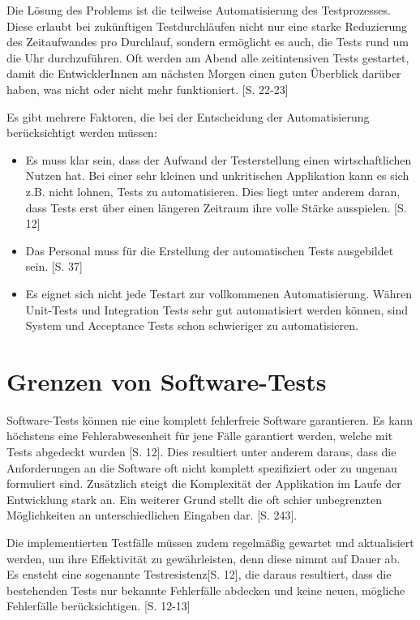 \documentclass[a4paper,bibtotoc,oneside]{scrbook}
\begin{document}
Die Lösung des Problems ist die teilweise Automatisierung des Testprozesses. Diese erlaubt bei zukünftigen Testdurchläufen nicht nur eine starke Reduzierung des Zeitaufwandes pro Durchlauf, sondern ermöglicht es auch, die Tests rund um die Uhr durchzuführen. Oft werden am Abend alle zeitintensiven Tests gestartet, damit die EntwicklerInnen am nächsten Morgen einen guten Überblick darüber haben, was nicht oder nicht mehr funktioniert. \cite{test_auto}[S. 22-23]

Es gibt mehrere Faktoren, die bei der Entscheidung der Automatisierung berücksichtigt werden müssen: 

\begin{itemize}
  \item Es muss klar sein, dass der Aufwand der Testerstellung einen wirtschaftlichen Nutzen hat. Bei einer sehr kleinen und unkritischen Applikation kann es sich z.B. nicht lohnen, Tests zu automatisieren. Dies liegt unter anderem daran, dass Tests erst über einen längeren Zeitraum ihre volle Stärke ausspielen. \cite{eval_regression}[S. 12]
  \item Das Personal muss für die Erstellung der automatischen Tests ausgebildet sein. \cite{eval_automat_webapp_test}[S. 37]
  \item Es eignet sich nicht jede Testart zur vollkommenen Automatisierung. Währen Unit-Tests und Integration Tests sehr gut automatisiert werden können, sind System und Acceptance Tests schon schwieriger zu automatisieren. 
\end{itemize}


\section{Grenzen von Software-Tests}
Software-Tests können nie eine komplett fehlerfreie Software garantieren. Es kann höchstens eine Fehlerabwesenheit für jene Fälle garantiert werden, welche mit Tests abgedeckt wurden \cite{eval_regression}[S. 12]. Dies resultiert unter anderem daraus, dass die Anforderungen an die Software oft nicht komplett spezifiziert oder zu ungenau formuliert sind. Zusätzlich steigt die Komplexität der Applikation im Laufe der Entwicklung stark an. Ein weiterer Grund stellt die oft schier unbegrenzten Möglichkeiten an unterschiedlichen Eingaben dar. \cite{software_qual}[S. 243].

Die implementierten Testfälle müssen zudem regelmäßig gewartet und aktualisiert werden, um ihre Effektivität zu gewährleisten, denn diese nimmt auf Dauer ab. Es ensteht eine sogenannte \glqq Testresistenz\grqq\cite{eval_regression}[S. 12], die daraus resultiert, dass die bestehenden Tests nur bekannte Fehlerfälle abdecken und keine neuen, mögliche Fehlerfälle berücksichtigen. \cite{eval_regression}[S. 12-13]
\end{document}
